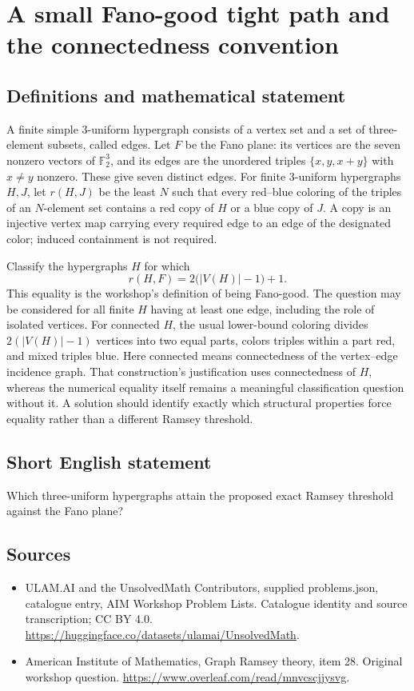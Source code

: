 \documentclass[11pt,a4paper]{article}
\begin{document}
\section*{A small Fano-good tight path and the connectedness convention}\label{statement}

\subsection{Definitions and mathematical statement}
A finite simple $3$-uniform hypergraph consists of a vertex set and a set of three-element subsets, called edges.
Let $F$ be the Fano plane: its vertices are the seven nonzero vectors of $\mathbb F_2^3$, and its edges are the unordered triples $\{x,y,x+y\}$ with $x\ne y$ nonzero.
These give seven distinct edges.
For finite $3$-uniform hypergraphs $H,J$, let $r(H,J)$ be the least $N$ such that every red--blue coloring of the triples of an $N$-element set contains a red copy of $H$ or a blue copy of $J$.
A copy is an injective vertex map carrying every required edge to an edge of the designated color; induced containment is not required.

Classify the hypergraphs $H$ for which
\[
 r(H,F)=2\bigl(|V(H)|-1\bigr)+1.
\]
This equality is the workshop's definition of being Fano-good.
The question may be considered for all finite $H$ having at least one edge, including the role of isolated vertices.
For connected $H$, the usual lower-bound coloring divides $2(|V(H)|-1)$ vertices into two equal parts, colors triples within a part red, and mixed triples blue.
Here connected means connectedness of the vertex--edge incidence graph.
That construction's justification uses connectedness of $H$, whereas the numerical equality itself remains a meaningful classification question without it.
A solution should identify exactly which structural properties force equality rather than a different Ramsey threshold.
\subsection{Short English statement}
Which three-uniform hypergraphs attain the proposed exact Ramsey threshold against the Fano plane?
\subsection{Sources}
\begin{itemize}
\item[S1] ULAM.AI and the UnsolvedMath Contributors, supplied problems.json, catalogue entry, AIM Workshop Problem Lists. Catalogue identity and source transcription; CC BY 4.0.
\url{https://huggingface.co/datasets/ulamai/UnsolvedMath}.
\item[S2] American Institute of Mathematics, Graph Ramsey theory, item 28. Original workshop question.
\url{https://www.overleaf.com/read/mnvcscjjysvg}.
\end{itemize}
\end{document}
